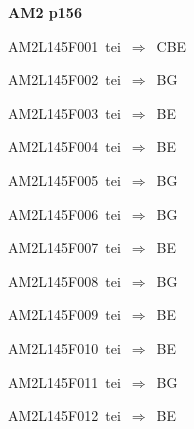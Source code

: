 \par\vfill\eject
{\bf\hfill AM2 p156\hfill\hbox{}}\par\bigskip
{\sixrm AM2L145F001\ {\sixit tei}\ }$\Rightarrow$\ CBE\par\smallskip
{\sixrm AM2L145F002\ {\sixit tei}\ }$\Rightarrow$\ BG\par\smallskip
{\sixrm AM2L145F003\ {\sixit tei}\ }$\Rightarrow$\ BE\par\smallskip
{\sixrm AM2L145F004\ {\sixit tei}\ }$\Rightarrow$\ BE\par\smallskip
{\sixrm AM2L145F005\ {\sixit tei}\ }$\Rightarrow$\ BG\par\smallskip
{\sixrm AM2L145F006\ {\sixit tei}\ }$\Rightarrow$\ BG\par\smallskip
{\sixrm AM2L145F007\ {\sixit tei}\ }$\Rightarrow$\ BE\par\smallskip
{\sixrm AM2L145F008\ {\sixit tei}\ }$\Rightarrow$\ BG\par\smallskip
{\sixrm AM2L145F009\ {\sixit tei}\ }$\Rightarrow$\ BE\par\smallskip
{\sixrm AM2L145F010\ {\sixit tei}\ }$\Rightarrow$\ BE\par\smallskip
{\sixrm AM2L145F011\ {\sixit tei}\ }$\Rightarrow$\ BG\par\smallskip
{\sixrm AM2L145F012\ {\sixit tei}\ }$\Rightarrow$\ BE\par\smallskip

